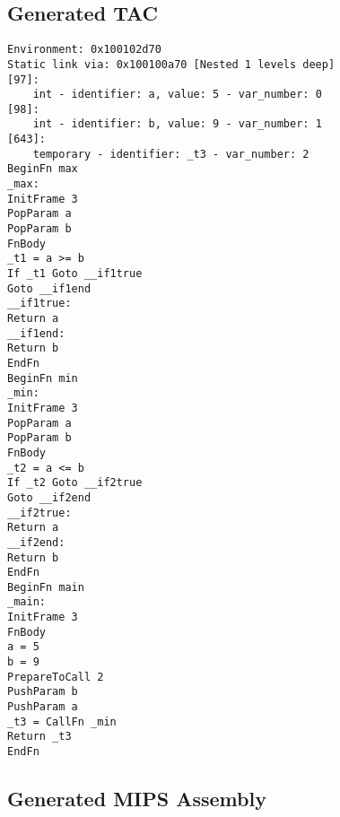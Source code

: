 \subsection{Generated TAC}
\begin{verbatim}
Environment: 0x100102d70
Static link via: 0x100100a70 [Nested 1 levels deep]
[97]:
	int - identifier: a, value: 5 - var_number: 0
[98]:
	int - identifier: b, value: 9 - var_number: 1
[643]:
	temporary - identifier: _t3 - var_number: 2
BeginFn max
_max:
InitFrame 3
PopParam a
PopParam b
FnBody
_t1 = a >= b
If _t1 Goto __if1true
Goto __if1end
__if1true:
Return a
__if1end:
Return b
EndFn
BeginFn min
_min:
InitFrame 3
PopParam a
PopParam b
FnBody
_t2 = a <= b
If _t2 Goto __if2true
Goto __if2end
__if2true:
Return a
__if2end:
Return b
EndFn
BeginFn main
_main:
InitFrame 3
FnBody
a = 5
b = 9
PrepareToCall 2
PushParam b
PushParam a
_t3 = CallFn _min
Return _t3
EndFn
\end{verbatim}\subsection{Generated MIPS Assembly}
